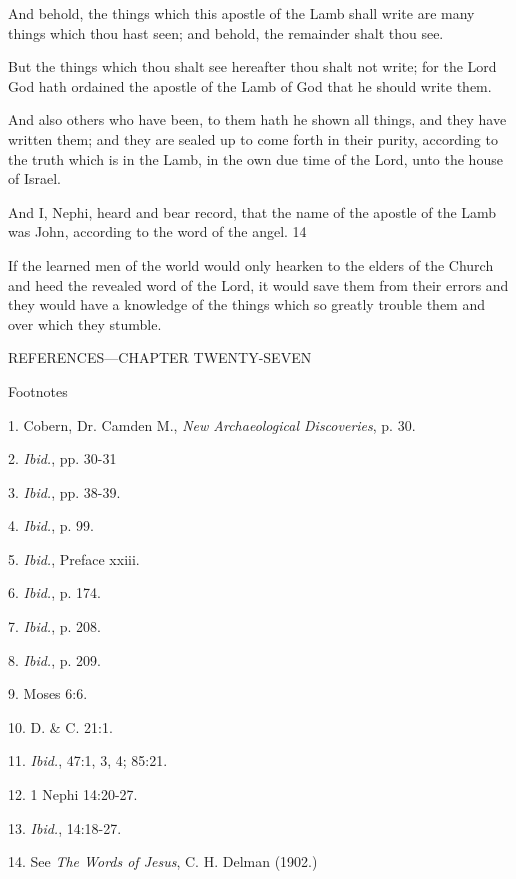 And behold, the things which this apostle of the Lamb shall write are many things which
thou hast seen; and behold, the remainder shalt thou see.

But the things which thou shalt see hereafter thou shalt not write; for the Lord God hath
ordained the apostle of the Lamb of God that he should write them.

And also others who have been, to them hath he shown all things, and they have written
them; and they are sealed up to come forth in their purity, according to the truth which is in
the Lamb, in the own due time of the Lord, unto the house of Israel.

And I, Nephi, heard and bear record, that the name of the apostle of the Lamb was John,
according to the word of the angel. 14

If the learned men of the world would only hearken to the elders of the Church and heed the
revealed word of the Lord, it would save them from their errors and they would have a
knowledge of the things which so greatly trouble them and over which they stumble.

\newpage
REFERENCES—CHAPTER TWENTY-SEVEN

Footnotes

1. Cobern, Dr. Camden M., \textit{New Archaeological Discoveries}, p. 30.

2. \textit{Ibid.}, pp. 30-31

3. \textit{Ibid.}, pp. 38-39.

4. \textit{Ibid.}, p. 99.

5. \textit{Ibid.}, Preface xxiii.

6. \textit{Ibid.}, p. 174.

7. \textit{Ibid.}, p. 208.

8. \textit{Ibid.}, p. 209.

9. Moses 6:6.

10. D. \& C. 21:1.

11. \textit{Ibid.}, 47:1, 3, 4; 85:21.

12. 1 Nephi 14:20-27.

13. \textit{Ibid.}, 14:18-27.

14. See \textit{The Words of Jesus}, C. H. Delman (1902.)

